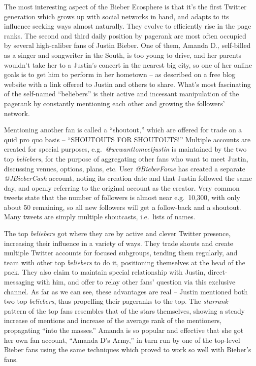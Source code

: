 \documentclass[10pt,oneside]{memoir}
\begin{document}
\begin{Spacing}{2}
The most interesting aspect of the Bieber Ecosphere is that it's the first Twitter generation which grows up with social networks in hand, and adapts to its influence seeking ways almost naturally.  They evolve to efficiently rise in the page ranks.  The second and third daily position by pagerank are most often occupied by several high-caliber fans of Justin Bieber.  One of them, Amanda D., self-billed as a singer and songwriter in the South, is too young to drive, and her parents wouldn't take her to a Justin's concert in the nearest big city, so one of her online goals is to get him to perform in her hometown -- as described on a free blog website with a link offered to Justin and others to share.  What's most fascinating of the self-named ``beliebers'' is their active and incessant manipulation of the pagerank by constantly mentioning each other and growing the followers' network.


Mentioning another fan is called a ``shoutout,'' which are offered for trade on a quid pro quo basis -- ``SHOUTOUTS FOR SHOUTOUTS!''  Multiple accounts are created for special purposes, e.g.\ {\itshape @wewanttomeetjustin} is maintained by the two top {\itshape beliebers}, for the purpose of aggregating other fans who want to meet Justin, discussing venues, options, plans, etc.  User {\itshape @BieberFame} has created a separate {\itshape @JBieberCash} account, noting its creation date and that Justin followed the same day, and openly referring to the original account as the creator.  Very common tweets state that the number of followers is almost near e.g.\ 10,300, with only about 50 remaining, so all new followers will get a follow-back and a shoutout.  Many tweets are simply multiple shoutcasts, i.e.\ lists of names.


The top {\itshape beliebers} got where they are by active and clever Twitter presence, increasing their influence in a variety of ways.  They trade shouts and create multiple Twitter accounts for focused subgroups, tending them regularly, and team with other top {\itshape beliebers} to do it, positioning themselves at the head of the pack.  They also claim to maintain special relationship with Justin, direct-messaging with him, and offer to relay other fans' question via this exclusive channel.  As far as we can see, these advantages are real -- Justin mentioned both two top {\itshape beliebers}, thus propelling their pageranks to the top.  The {\itshape starrank} pattern of the top fans resembles that of the stars themselves, showing a steady increase of mentions and increase of the average rank of the mentioners, propagating ``into the masses.''  Amanda is so popular and effective that she got her own fan account, ``Amanda D's Army,'' in turn run by one of the top-level Bieber fans using the same techniques which proved to work so well with Bieber's fans.



\end{Spacing}
\end{document}
